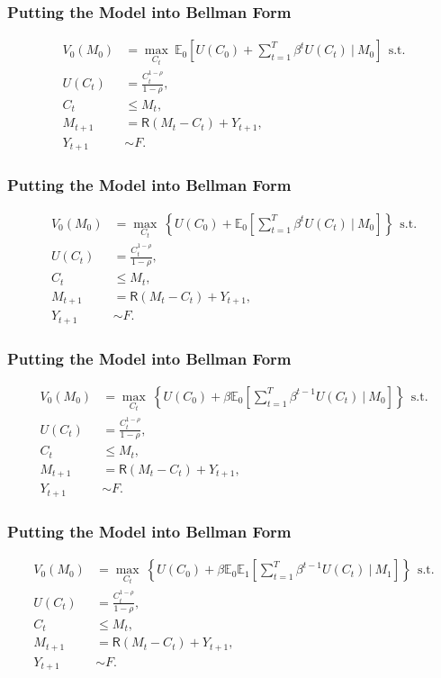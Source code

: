 \documentclass[aspectratio=169]{beamer}
\newcommand{\E}{\mathbb{E}}
\begin{document}
\begin{frame}
\frametitle{Putting the Model into Bellman Form}

\begin{align*}
V_0(M_0) &= \max_{C_t} ~\E_0 \left[ U(C_0) + \sum_{t=1}^T \beta^t U(C_t) ~\bigg|~ M_0 \right] ~~\text{s.t.} \\
U(C_t) &= \frac{C_t^{1-\rho}}{1-\rho}, \\
C_t &\leq M_t, \\
M_{t+1} &= \mathsf{R} (M_t - C_t) + Y_{t+1}, \\
Y_{t+1} &\sim F.
\end{align*}
\end{frame}


\begin{frame}
\frametitle{Putting the Model into Bellman Form}

\begin{align*}
V_0(M_0) &= \max_{C_t} ~ \left\{ U(C_0) + \E_0 \left[ \sum_{t=1}^T \beta^t U(C_t) ~\bigg|~ M_0 \right] \right\} ~~\text{s.t.} \\
U(C_t) &= \frac{C_t^{1-\rho}}{1-\rho}, \\
C_t &\leq M_t, \\
M_{t+1} &= \mathsf{R} (M_t - C_t) + Y_{t+1}, \\
Y_{t+1} &\sim F.
\end{align*}
\end{frame}


\begin{frame}
\frametitle{Putting the Model into Bellman Form}

\begin{align*}
V_0(M_0) &= \max_{C_t} ~ \left\{ U(C_0) + \beta \E_0 \left[ \sum_{t=1}^T \beta^{t-1} U(C_t) ~\bigg|~ M_0 \right] \right\} ~~\text{s.t.} \\
U(C_t) &= \frac{C_t^{1-\rho}}{1-\rho}, \\
C_t &\leq M_t, \\
M_{t+1} &= \mathsf{R} (M_t - C_t) + Y_{t+1}, \\
Y_{t+1} &\sim F.
\end{align*}
\end{frame}


\begin{frame}
\frametitle{Putting the Model into Bellman Form}

\begin{align*}
V_0(M_0) &= \max_{C_t} ~ \left\{ U(C_0) + \beta \E_0 \E_1 \left[ \sum_{t=1}^T \beta^{t-1} U(C_t) ~\bigg|~ M_1 \right] \right\} ~~\text{s.t.} \\
U(C_t) &= \frac{C_t^{1-\rho}}{1-\rho}, \\
C_t &\leq M_t, \\
M_{t+1} &= \mathsf{R} (M_t - C_t) + Y_{t+1}, \\
Y_{t+1} &\sim F.
\end{align*}
\end{frame}
\end{document}
